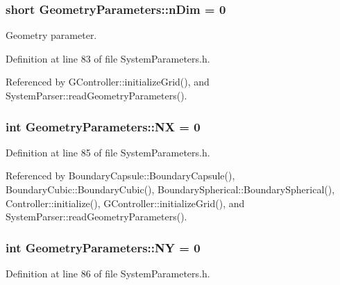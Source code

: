 \hypertarget{structGeometryParameters_aa50b4a0940d8ca9da6f647a1c21d9522}{
\subsubsection[{n\+Dim}]{\setlength{\rightskip}{0pt plus 5cm}short Geometry\+Parameters\+::n\+Dim = 0}}\label{structGeometryParameters_aa50b4a0940d8ca9da6f647a1c21d9522}


Geometry parameter. 



Definition at line 83 of file System\+Parameters.\+h.



Referenced by G\+Controller\+::initialize\+Grid(), and System\+Parser\+::read\+Geometry\+Parameters().

\hypertarget{structGeometryParameters_a45f424cfb62b868a4becc8b0bd0d32bc}{
\subsubsection[{N\+X}]{\setlength{\rightskip}{0pt plus 5cm}int Geometry\+Parameters\+::\+N\+X = 0}}\label{structGeometryParameters_a45f424cfb62b868a4becc8b0bd0d32bc}


Definition at line 85 of file System\+Parameters.\+h.



Referenced by Boundary\+Capsule\+::\+Boundary\+Capsule(), Boundary\+Cubic\+::\+Boundary\+Cubic(), Boundary\+Spherical\+::\+Boundary\+Spherical(), Controller\+::initialize(), G\+Controller\+::initialize\+Grid(), and System\+Parser\+::read\+Geometry\+Parameters().

\hypertarget{structGeometryParameters_a5c7a33268cbfa1b236fa1bf0ef9bafc7}{
\subsubsection[{N\+Y}]{\setlength{\rightskip}{0pt plus 5cm}int Geometry\+Parameters\+::\+N\+Y = 0}}\label{structGeometryParameters_a5c7a33268cbfa1b236fa1bf0ef9bafc7}


Definition at line 86 of file System\+Parameters.\+h.



